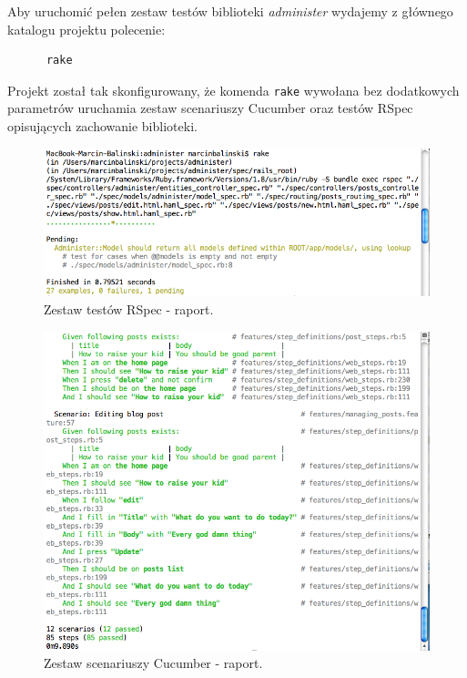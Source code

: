     Aby uruchomić pełen zestaw testów biblioteki \emph{administer} wydajemy z głównego katalogu projektu polecenie:
    
    \begin{lstlisting}
      rake
    \end{lstlisting}
    
    Projekt został tak skonfigurowany, że komenda \texttt{rake} wywołana bez dodatkowych parametrów uruchamia zestaw scenariuszy Cucumber oraz testów RSpec opisujących zachowanie biblioteki. 
    
    
    \vspace{5 mm}
    \begin{figure}[!h]
  		\begin{center}
  			\includegraphics[width=\linewidth]{images/spec_report.png}
  			\caption{Zestaw testów RSpec - raport.}
  			\label{spec_report}
  		\end{center}
  	\end{figure}
  	
  	\clearpage
  	
  	\begin{figure}[!h]
  		\begin{center}
  			\includegraphics[width=\linewidth]{images/features_report.png}
  			\caption{Zestaw scenariuszy Cucumber - raport.}
  			\label{features_report}
  		\end{center}
  	\end{figure}
  	
